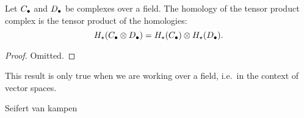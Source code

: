 \begin{prop}
    Let $C_\bullet$ and  $D_\bullet$ be complexes over a field.
    The homology of the tensor product complex is the tensor product of the homologies:
    \[
        H_\star(C_\bullet \otimes D_\bullet) = H_\star(C_\bullet) \otimes H_\star(D_\bullet)
    .\] 
    \label{prop:hom-tensor-is-tensor-hom}
\end{prop}
\begin{proof}
    Omitted.
\end{proof}
\begin{remark}
    This result is only true when we are working over a field, i.e.\ in the context of vector spaces.
\end{remark}


\begin{definition}

\end{definition}
\begin{definition}
    Seifert van kampen
\end{definition}
